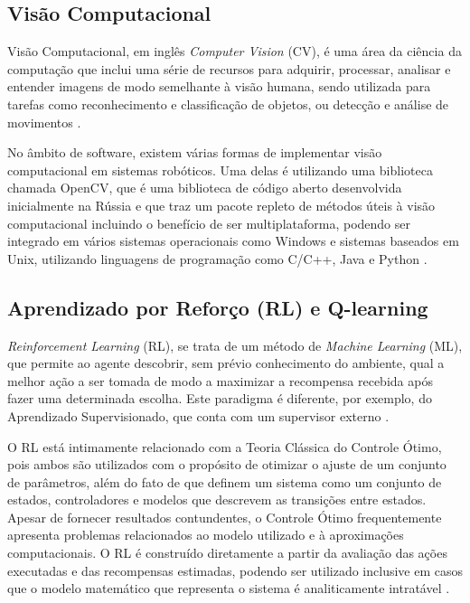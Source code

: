 \documentclass[a4paper]{ifacconf}
\begin{document}
\subsection{Visão Computacional}

Visão Computacional, em inglês \textit{Computer Vision} (CV), é uma área da ciência da computação que inclui uma série de recursos para adquirir, processar, analisar e entender imagens de modo semelhante à visão humana, sendo utilizada para tarefas como reconhecimento e classificação de objetos, ou detecção e análise de movimentos \cite{comp_vis}.

No âmbito de software, existem várias formas de implementar visão computacional em sistemas robóticos. Uma delas é utilizando uma biblioteca chamada OpenCV, que é uma biblioteca de código aberto desenvolvida inicialmente na Rússia e que traz um pacote repleto de métodos úteis à visão computacional incluindo o benefício de ser multiplataforma, podendo ser integrado em vários sistemas operacionais como Windows e sistemas baseados em Unix, utilizando linguagens de programação como C/C++, Java e Python \cite{comp_vis,ocv_ref}.



\subsection{Aprendizado por Reforço (RL) e Q-learning}
\emph{Reinforcement Learning} (RL), se trata de um método de \emph{Machine Learning} (ML), que permite ao agente descobrir, sem prévio conhecimento do ambiente, qual a melhor ação a ser tomada de modo a maximizar a recompensa recebida após fazer uma determinada escolha. Este paradigma é diferente, por exemplo, do Aprendizado Supervisionado, que conta com um supervisor externo \cite{intro_to_rl,rl_rob_survey,ql_pid_robotics,ql_model}.

O RL está intimamente relacionado com a Teoria Clássica do Controle Ótimo, pois ambos são utilizados com o propósito de otimizar o ajuste de um conjunto de parâmetros, além do fato de que definem um sistema como um conjunto de estados, controladores e modelos que descrevem as transições entre estados. Apesar de fornecer resultados contundentes, o Controle Ótimo frequentemente apresenta problemas relacionados ao modelo utilizado e à aproximações computacionais. O RL é construído diretamente a partir da avaliação das ações executadas e das recompensas estimadas, podendo ser utilizado inclusive em casos que o modelo matemático que representa o sistema é analiticamente intratável \cite{rl_rob_survey}. 
\end{document}
